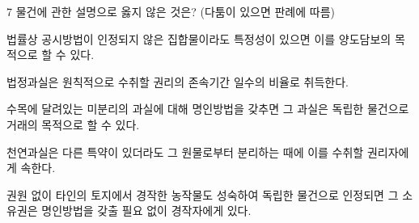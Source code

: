 \begin{question}{7}
물건에 관한 설명으로 옳지 않은 것은? (다툼이 있으면 판례에 따름)
\begin{choices}
  \item 법률상 공시방법이 인정되지 않은 집합물이라도 특정성이 있으면 이를 양도담보의 목적으로 할 수 있다.
  \item 법정과실은 원칙적으로 수취할 권리의 존속기간 일수의 비율로 취득한다.
  \item 수목에 달려있는 미분리의 과실에 대해 명인방법을 갖추면 그 과실은 독립한 물건으로 거래의 목적으로 할 수 있다.
  \item 천연과실은 다른 특약이 있더라도 그 원물로부터 분리하는 때에 이를 수취할 권리자에게 속한다.
  \item 권원 없이 타인의 토지에서 경작한 농작물도 성숙하여 독립한 물건으로 인정되면 그 소유권은 명인방법을 갖출 필요 없이 경작자에게 있다.
\end{choices}
\end{question}
